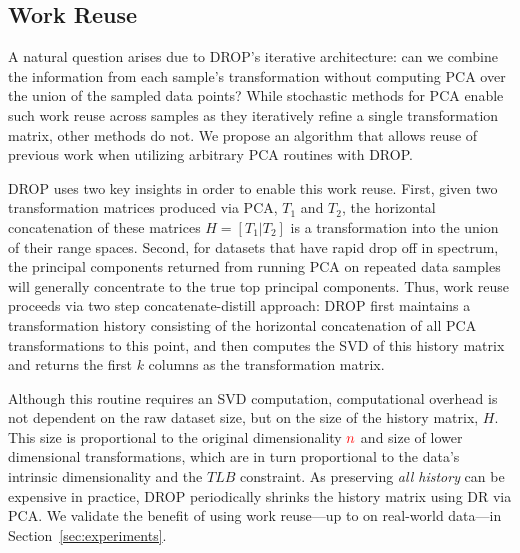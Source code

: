 \subsection{Work Reuse}
\label{subsec:reuse}

A natural question arises due to DROP's iterative architecture: can we combine the information from each sample's transformation without computing PCA over the union of the sampled data points? 
While stochastic methods for PCA enable such work reuse across samples as they iteratively refine a single transformation matrix, other methods do not.
We propose an algorithm that allows reuse of previous work when utilizing arbitrary PCA routines with DROP.

DROP uses two key insights in order to enable this work reuse.  
First, given two transformation matrices produced via PCA, $T_1$ and $T_2$, the horizontal concatenation of these matrices $H = [T_1 | T_2]$ is a transformation into the union of their range spaces.
Second, for datasets that have rapid drop off in spectrum, the principal components returned from running PCA on repeated data samples will generally concentrate to the true top principal components. 
Thus, work reuse proceeds via two step concatenate-distill approach:
DROP first maintains a transformation history consisting of the horizontal concatenation of all PCA transformations to this point, and then computes the SVD of this history matrix and returns the first $k$ columns as the transformation matrix. 

Although this routine requires an SVD computation, computational overhead is not dependent on the raw dataset size, but on the size of the history matrix, $H$.
This size is proportional to the original dimensionality ${\color{red}n}$ and size of lower dimensional transformations, which are in turn proportional to the data's intrinsic dimensionality and the $TLB$ constraint.
As preserving \emph{all history} can be expensive in practice, 
DROP periodically shrinks the history matrix using DR via PCA. 
We validate the benefit of using work reuse---up to  on real-world data---in Section~\ref{sec:experiments}.


